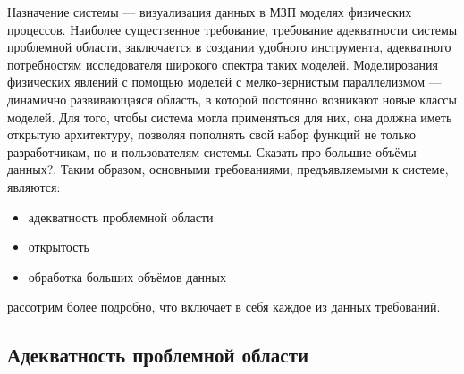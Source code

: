 \documentclass[a4paper,12pt]{extarticle}
\begin{document}
Назначение системы — визуализация данных в МЗП моделях физических процессов.  Наиболее существенное требование, требование адекватности системы проблемной области, заключается в создании удобного инструмента, адекватного потребностям исследователя широкого спектра таких моделей.  Моделирования физических явлений с помощью моделей с мелко-зернистым параллелизмом — динамично развивающаяся область, в которой постоянно возникают новые классы моделей. Для того, чтобы система могла применяться для них, она должна иметь открытую архитектуру, позволяя пополнять свой набор функций не только разработчикам, но и пользователям системы. Сказать про большие объёмы данных?. Таким образом, основными требованиями, предъявляемыми к системе, являются:
\begin{itemize}
    \item адекватность проблемной области
    \item открытость
    \item обработка больших объёмов данных
\end{itemize}

рассотрим более подробно, что включает в себя каждое из данных требований.

\subsection{Адекватность проблемной области}
\end{document}
